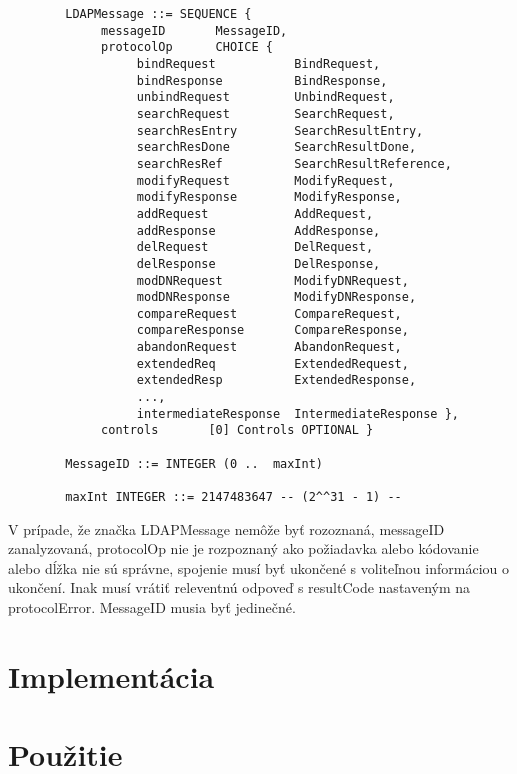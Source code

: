 \documentclass[11pt,a4paper]{article}
\begin{document}
\begin{verbatim}
        LDAPMessage ::= SEQUENCE {
             messageID       MessageID,
             protocolOp      CHOICE {
                  bindRequest           BindRequest,
                  bindResponse          BindResponse,
                  unbindRequest         UnbindRequest,
                  searchRequest         SearchRequest,
                  searchResEntry        SearchResultEntry,
                  searchResDone         SearchResultDone,
                  searchResRef          SearchResultReference,
                  modifyRequest         ModifyRequest,
                  modifyResponse        ModifyResponse,
                  addRequest            AddRequest,
                  addResponse           AddResponse,
                  delRequest            DelRequest,
                  delResponse           DelResponse,
                  modDNRequest          ModifyDNRequest,
                  modDNResponse         ModifyDNResponse,
                  compareRequest        CompareRequest,
                  compareResponse       CompareResponse,
                  abandonRequest        AbandonRequest,
                  extendedReq           ExtendedRequest,
                  extendedResp          ExtendedResponse,
                  ...,
                  intermediateResponse  IntermediateResponse },
             controls       [0] Controls OPTIONAL }

        MessageID ::= INTEGER (0 ..  maxInt)

        maxInt INTEGER ::= 2147483647 -- (2^^31 - 1) --
\end{verbatim}

V prípade, že značka LDAPMessage nemôže byť rozoznaná, messageID zanalyzovaná, protocolOp nie je rozpoznaný ako požiadavka alebo kódovanie alebo dĺžka nie sú správne, spojenie musí byť ukončené s voliteľnou informáciou o ukončení. Inak musí vrátiť releventnú odpoveď s resultCode nastaveným na protocolError. MessageID musia byť jedinečné.

\section{Implementácia}
\section{Použitie}
\end{document}
